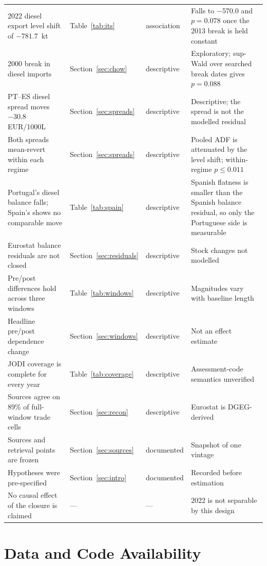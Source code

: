 \documentclass[11pt,a4paper]{article}
\begin{document}
\begin{longtable}{L{4.1cm}L{3.5cm}L{2.2cm}L{4.4cm}}
2022 diesel export level shift of $-781.7$~kt & Table~\ref{tab:its} & association & Falls to $-570.0$ and $p=0.078$ once the 2013 break is held constant \\
2000 break in diesel imports & Section~\ref{sec:chow} & descriptive & Exploratory; sup-Wald over searched break dates gives $p=0.088$ \\
PT--ES diesel spread moves $-30.8$ EUR/1000L & Section~\ref{sec:spreads} & descriptive & Descriptive; the spread is not the modelled residual \\
Both spreads mean-revert within each regime & Section~\ref{sec:spreads} & descriptive & Pooled ADF is attenuated by the level shift; within-regime $p\le 0.011$ \\
Portugal's diesel balance falls; Spain's shows no comparable move & Table~\ref{tab:spain} & descriptive & Spanish flatness is smaller than the Spanish balance residual, so only the Portuguese side is measurable \\
Eurostat balance residuals are not closed & Section~\ref{sec:residuals} & descriptive & Stock changes not modelled \\
Pre/post differences hold across three windows & Table~\ref{tab:windows} & descriptive & Magnitudes vary with baseline length \\
Headline pre/post dependence change & Section~\ref{sec:windows} & descriptive & Not an effect estimate \\
JODI coverage is complete for every year & Table~\ref{tab:coverage} & descriptive & Assessment-code semantics unverified \\
Sources agree on 89\% of full-window trade cells & Section~\ref{sec:recon} & descriptive & Eurostat is DGEG-derived \\
Sources and retrieval points are frozen & Section~\ref{sec:sources} & documented & Snapshot of one vintage \\
Hypotheses were pre-specified & Section~\ref{sec:intro} & documented & Recorded before estimation \\
No causal effect of the closure is claimed & --- & --- & 2022 is not separable by this design \\
\bottomrule
\end{longtable}



\appendix

\section{Data and Code Availability}
\label{app:availability}
\end{document}
